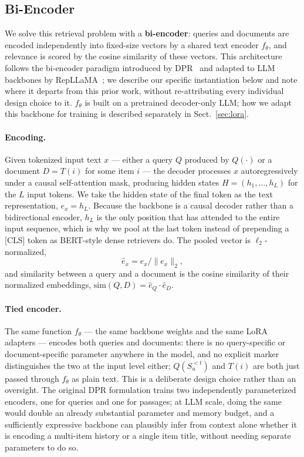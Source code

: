 \documentclass[runningheads]{llncs}
\begin{document}
\subsection{Bi-Encoder}
\label{sec:biencoder}

We solve this retrieval problem with a \textbf{bi-encoder}: queries and documents are encoded independently into fixed-size vectors by a shared text encoder $f_\theta$, and relevance is scored by the cosine similarity of these vectors. This architecture follows the bi-encoder paradigm introduced by DPR~\cite{karpukhin2020} and adapted to LLM backbones by RepLLaMA~\cite{ma2024}; we describe our specific instantiation below and note where it departs from this prior work, without re-attributing every individual design choice to it. $f_\theta$ is built on a pretrained decoder-only LLM; how we adapt this backbone for training is described separately in Sect.~\ref{sec:lora}.

\paragraph{Encoding.}
Given tokenized input text $x$ --- either a query $Q$ produced by $Q(\cdot)$ or a document $D = T(i)$ for some item $i$ --- the decoder processes $x$ autoregressively under a causal self-attention mask, producing hidden states $H =
(h_1,\dots,h_L)$ for the $L$ input tokens. We take the hidden state of the final token as the text representation, $e_x = h_L$. Because the backbone is a causal decoder rather than a bidirectional encoder, $h_L$ is the only position that has attended to the entire input sequence, which is why we pool at the last token instead of prepending a [CLS] token as BERT-style dense retrievers do. The pooled vector is $\ell_2$-normalized,
\[
\hat e_x = e_x / \lVert e_x \rVert_2,
\]
and similarity between a query and a document is the cosine similarity of their normalized embeddings, $\mathrm{sim}(Q,D) = \hat e_Q \cdot \hat e_D$.

\paragraph{Tied encoder.}
The same function $f_\theta$ --- the same backbone weights and the same LoRA adapters --- encodes both queries and documents: there is no query-specific or document-specific parameter anywhere in the model, and no explicit marker distinguishes the two at the input level either; $Q(S_u^{<t})$ and $T(i)$ are both just passed through $f_\theta$ as plain text. This is a deliberate design choice rather than an oversight. The original DPR formulation trains two independently parameterized encoders, one for queries and one for passages; at LLM scale, doing the same would double an already substantial parameter and memory budget, and a sufficiently expressive backbone can plausibly infer from context alone whether it is encoding a multi-item history or a single item title, without needing separate parameters to do so.
\end{document}
